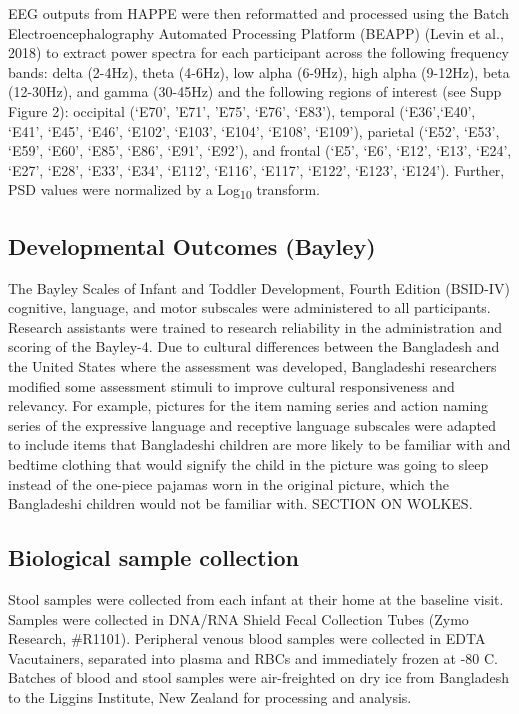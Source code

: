 \documentclass{article}
\begin{document}
EEG outputs from HAPPE were then reformatted and processed using the Batch Electroencephalography Automated Processing Platform (BEAPP) (Levin et al., 2018) to extract power spectra for each participant across the following frequency bands: delta (2-4Hz), theta (4-6Hz), low alpha (6-9Hz), high alpha (9-12Hz), beta (12-30Hz), and gamma (30-45Hz) and the following regions of interest (see Supp Figure 2): occipital (‘E70’, ’E71’, ’E75’, ‘E76’, ‘E83’), temporal (‘E36’,‘E40’, ‘E41’, ‘E45’, ‘E46’, ‘E102’, ‘E103’, ‘E104’, ‘E108’, ‘E109’), parietal (‘E52’, ‘E53’, ‘E59’, ‘E60’, ‘E85’, ‘E86’, ‘E91’, ‘E92’), and frontal (‘E5’, ‘E6’, ‘E12’, ‘E13’, ‘E24’, ‘E27’, ‘E28’, ‘E33’, ‘E34’, ‘E112’, ‘E116’, ‘E117’, ‘E122’, ‘E123’, ‘E124’).
Further, PSD values were normalized by a Log\textsubscript{10} transform.

\subsection*{Developmental Outcomes (Bayley)}
The Bayley Scales of Infant and Toddler Development, Fourth Edition (BSID-IV) cognitive, language, and motor subscales were administered to all participants.
Research assistants were trained to research reliability in the administration and scoring of the Bayley-4.
Due to cultural differences between the Bangladesh and the United States where the assessment was developed, Bangladeshi researchers modified some assessment stimuli to improve cultural responsiveness and relevancy.
For example, pictures for the item naming series and action naming series of the expressive language and receptive language subscales were adapted to include items that Bangladeshi children are more likely to be familiar with and bedtime clothing that would signify the child in the picture was going to sleep instead of the one-piece pajamas worn in the original picture, which the Bangladeshi children would not be familiar with. 
SECTION ON WOLKES.

\subsection*{Biological sample collection}
Stool samples were collected from each infant at their home at the baseline visit.
Samples were collected in DNA/RNA Shield Fecal Collection Tubes (Zymo Research, \#R1101).
Peripheral venous blood samples were collected in EDTA Vacutainers, separated into plasma and RBCs and immediately frozen at -80 C.
Batches of blood and stool samples were air-freighted on dry ice from Bangladesh to the Liggins Institute, New Zealand for processing and analysis. 
\end{document}
